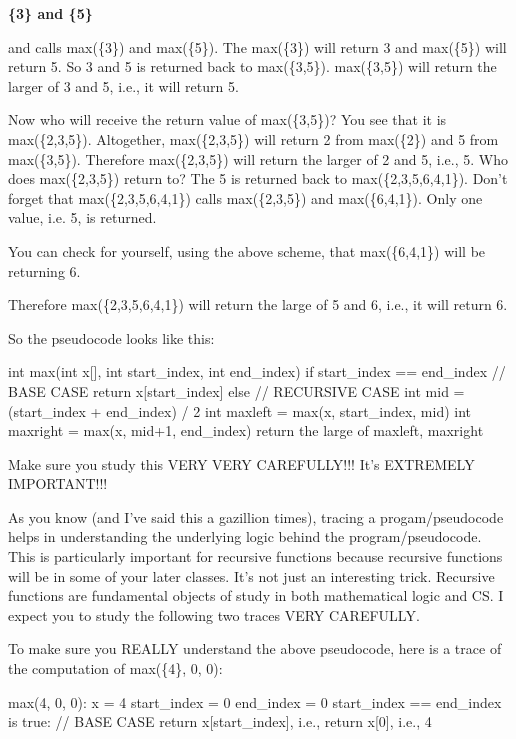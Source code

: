\textbf{\{3\} and \{5\}}

and calls max(\{3\}) and max(\{5\}). The max(\{3\}) will return 3 and
max(\{5\}) will return 5. So 3 and 5 is returned back to max(\{3,5\}).
max(\{3,5\}) will return the larger of 3 and 5, i.e., it will return 5.

Now who will receive the return value of max(\{3,5\})? You see that it
is max(\{2,3,5\}). Altogether, max(\{2,3,5\}) will return 2 from
max(\{2\}) and 5 from max(\{3,5\}). Therefore max(\{2,3,5\}) will return
the larger of 2 and 5, i.e., 5. Who does max(\{2,3,5\}) return to? The 5
is returned back to max(\{2,3,5,6,4,1\}). Don't forget
that max(\{2,3,5,6,4,1\}) calls max(\{2,3,5\}) and max(\{6,4,1\}). Only
one value, i.e. 5, is returned.

You can check for yourself, using the above scheme, that max(\{6,4,1\}) will be returning 6.

Therefore max(\{2,3,5,6,4,1\}) will return the large of 5 and 6, i.e.,
it will return 6.

So the pseudocode looks like this:

\begin{consolethree}[escapeinside=||]
int max(int x[], int start_index, int end_index)
{
    if start_index == end_index
    {
        // BASE CASE
        return x[start_index]
    }
    else
    {
        // RECURSIVE CASE
        int mid = (start_index + end_index) / 2
        int maxleft = max(x, start_index, mid)
        int maxright = max(x, mid+1, end_index)
        return the large of maxleft, maxright
    }
}
\end{consolethree}

Make sure you study this VERY VERY CAREFULLY!!! It's
EXTREMELY IMPORTANT!!!

As you know (and I've said this a gazillion times),
tracing a progam/pseudocode helps in understanding the underlying logic
behind the program/pseudocode. This is particularly important for
recursive functions because recursive functions will be in some of your
later classes. It's not just an interesting trick.
Recursive functions are fundamental objects of study in both
mathematical logic and CS. I expect you to study the following two
traces VERY CAREFULLY.

To make sure you REALLY understand the above pseudocode, here is a trace
of the computation of max(\{4\}, 0, 0):

\begin{consolethree}
max({4}, 0, 0):
    x = {4}
    start_index = 0
    end_index = 0
    start_index == end_index is true:
        // BASE CASE
        return x[start_index], i.e., return x[0], i.e., 4
\end{consolethree}

